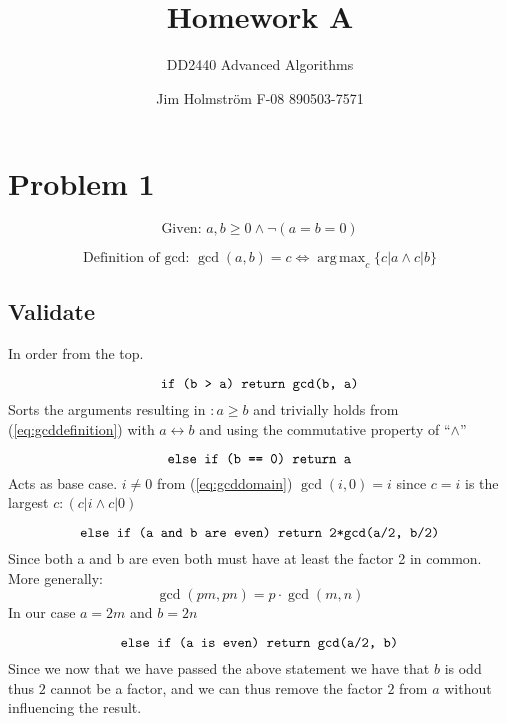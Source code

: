 \documentclass[a4paper,twoside=false,abstract=false,numbers=noenddot,
titlepage=false,headings=small,parskip=half,version=last]{scrartcl}
\author{Jim Holmström F-08 890503-7571}
\title{Homework A}
\subtitle{DD2440 Advanced Algorithms}
\DeclareMathOperator*{\argmax}{arg\,max}
\begin{document}
\maketitle

\section{Problem 1}

\begin{equation} \label{eq:gcddomain}
    \text{Given: }    a,b \ge 0 \wedge \neg(a=b=0)
\end{equation}

\begin{equation} \label{eq:gcddefinition}
   \text{Definition of gcd: } \gcd(a,b)=c \iff \argmax_c \{c|a \wedge c|b\}
\end{equation}

\subsection{Validate}

In order from the top.

\begin{equation} \label{eq:statement1}
    \verb+if (b > a) return gcd(b, a)+
\end{equation}
Sorts the arguments resulting in $: a \ge b$ and trivially holds from (\ref{eq:gcddefinition}) with $a \leftrightarrow b$ and using the commutative property of ``$\wedge$''

\begin{equation} \label{eq:statement2}
    \verb+else if (b == 0) return a+
\end{equation}
Acts as base case. $i \neq 0$ from (\ref{eq:gcddomain}) $\gcd(i,0)=i$ since $c=i$ is the largest $c : (c|i \wedge c|0)$

\begin{equation} \label{eq:statement3}
    \verb+else if (a and b are even) return 2*gcd(a/2, b/2)+ 
\end{equation}
Since both a and b are even both must have at least the factor 2 in common.
More generally:
\begin{equation}
    \gcd(pm,pn)=p\cdot \gcd(m,n)
\end{equation}
In our case $a=2m$ and $b=2n$

\begin{equation} \label{eq:statement4}
    \verb+else if (a is even) return gcd(a/2, b)+
\end{equation}
Since we now that we have passed the above statement we have that $b$ is odd thus $2$ cannot be a factor, and we can thus remove the factor $2$ from $a$ without influencing the result.
\end{document}
